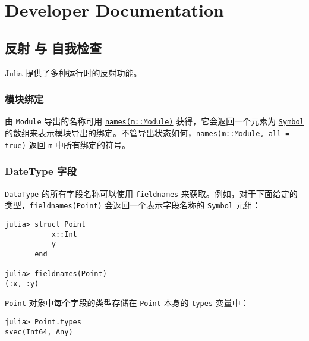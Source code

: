 
\part{Developer Documentation}


\hypertarget{10788491312865149564}{}


\chapter{反射 与 自我检查}



Julia 提供了多种运行时的反射功能。



\hypertarget{14842331990094437788}{}


\section{模块绑定}



由 \texttt{Module} 导出的名称可用 \hyperlink{6473328671144201991}{\texttt{names(m::Module)}} 获得，它会返回一个元素为 \hyperlink{18332791376992528422}{\texttt{Symbol}} 的数组来表示模块导出的绑定。不管导出状态如何，\texttt{names(m::Module, all = true)} 返回 \texttt{m} 中所有绑定的符号。



\hypertarget{3191587172542435875}{}


\section{DateType 字段}



\texttt{DataType} 的所有字段名称可以使用 \hyperlink{17481253338332315021}{\texttt{fieldnames}} 来获取。例如，对于下面给定的类型，\texttt{fieldnames(Point)} 会返回一个表示字段名称的 \hyperlink{18332791376992528422}{\texttt{Symbol}} 元组：




\begin{verbatim}
julia> struct Point
           x::Int
           y
       end

julia> fieldnames(Point)
(:x, :y)
\end{verbatim}



\texttt{Point} 对象中每个字段的类型存储在 \texttt{Point} 本身的 \texttt{types} 变量中：




\begin{verbatim}
julia> Point.types
svec(Int64, Any)
\end{verbatim}



